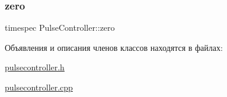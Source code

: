\subsubsection{\texorpdfstring{zero}{zero}}
{\footnotesize\ttfamily timespec Pulse\+Controller\+::zero}



Объявления и описания членов классов находятся в файлах\+:\begin{DoxyCompactItemize}
\item 
\hyperlink{pulsecontroller_8h}{pulsecontroller.\+h}\item 
\hyperlink{pulsecontroller_8cpp}{pulsecontroller.\+cpp}\end{DoxyCompactItemize}
